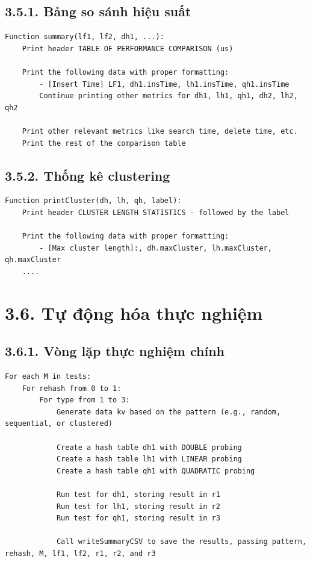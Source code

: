 \documentclass[12pt,a4paper]{report}
\begin{document}
\subsection*{3.5.1. Bảng so sánh hiệu suất}
\begin{lstlisting}[style=numbered]
Function summary(lf1, lf2, dh1, ...):
    Print header TABLE OF PERFORMANCE COMPARISON (us)

    Print the following data with proper formatting:
        - [Insert Time] LF1, dh1.insTime, lh1.insTime, qh1.insTime
        Continue printing other metrics for dh1, lh1, qh1, dh2, lh2, qh2
    
    Print other relevant metrics like search time, delete time, etc.
    Print the rest of the comparison table
\end{lstlisting}

\subsection*{3.5.2. Thống kê clustering}
\begin{lstlisting}[style=numbered]
Function printCluster(dh, lh, qh, label):
    Print header CLUSTER LENGTH STATISTICS - followed by the label

    Print the following data with proper formatting:
        - [Max cluster length]:, dh.maxCluster, lh.maxCluster, qh.maxCluster
    ....
\end{lstlisting}

\section*{3.6. Tự động hóa thực nghiệm}

\subsection*{3.6.1. Vòng lặp thực nghiệm chính}
\begin{lstlisting}[style=numbered]
For each M in tests:
    For rehash from 0 to 1:
        For type from 1 to 3:
            Generate data kv based on the pattern (e.g., random, sequential, or clustered)
            
            Create a hash table dh1 with DOUBLE probing
            Create a hash table lh1 with LINEAR probing
            Create a hash table qh1 with QUADRATIC probing
            
            Run test for dh1, storing result in r1
            Run test for lh1, storing result in r2
            Run test for qh1, storing result in r3
            
            Call writeSummaryCSV to save the results, passing pattern, rehash, M, lf1, lf2, r1, r2, and r3
\end{lstlisting}
\end{document}
